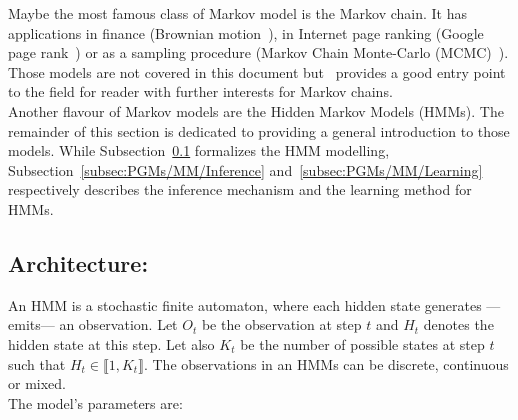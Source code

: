 \documentclass[a4paper,11pt]{report}
\begin{document}
    Maybe the most famous class of Markov model is the Markov chain. It has applications in finance (Brownian motion~\citep{duncan2000stochastic}), in Internet page ranking (Google page rank~\citep{haveliwala2003second}) or as a sampling procedure (Markov Chain Monte-Carlo (MCMC)~\citep{gilks2005markov}). Those models are not covered in this document but~\citep{kemeny1960finite} provides a good entry point to the field for reader with further interests for Markov chains.\\
    
    Another flavour of Markov models are the Hidden Markov Models (HMMs). The remainder of this section is dedicated to providing a general introduction to those models. While Subsection~\ref{subsec:PGMs/MM/Architecture} formalizes the HMM modelling, Subsection~\ref{subsec:PGMs/MM/Inference} and~\ref{subsec:PGMs/MM/Learning} respectively describes the inference mechanism and the learning method for HMMs.    
    
    \subsection{Architecture:}
      \label{subsec:PGMs/MM/Architecture}
      
      An HMM is a stochastic finite automaton, where each hidden state generates ---\ie emits--- an observation. Let $O_{t}$ be the observation at step $t$ and $H_{t}$ denotes the hidden state at this step. Let also $K_{t}$ be the number of possible states at step $t$ such that $H_{t} \in \llbracket 1, K_{t} \rrbracket$. The observations in an HMMs can be discrete, continuous or mixed.\\
      
      The model's parameters are:\\ 
      
\end{document}
